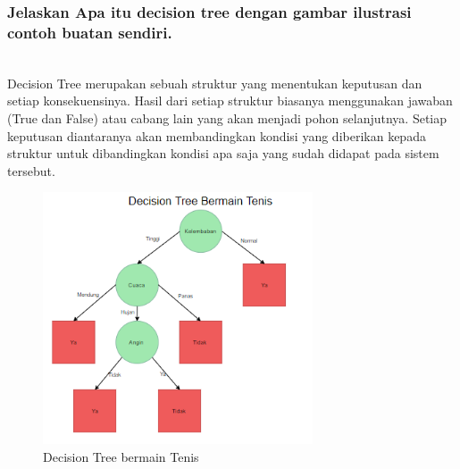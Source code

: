 \subsubsection{Jelaskan Apa itu decision tree dengan gambar ilustrasi contoh buatan sendiri.}
\hfill\\
Decision Tree merupakan sebuah struktur yang menentukan keputusan dan setiap konsekuensinya. Hasil dari setiap struktur biasanya menggunakan jawaban (True dan False) atau cabang lain yang akan menjadi pohon selanjutnya. Setiap keputusan diantaranya akan membandingkan kondisi yang diberikan kepada struktur untuk dibandingkan kondisi apa saja yang sudah didapat pada sistem tersebut.
\begin{figure}[H]
    \includegraphics[width=8cm]{figures/1174083/figures2/8.png}
    \centering
    \caption{Decision Tree bermain Tenis}
\end{figure}


